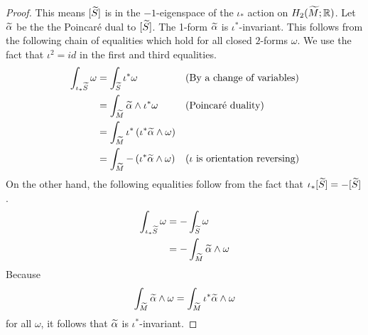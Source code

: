 \begin{proof}
  This means $[\widetilde{S}]$ is in the $-1$-eigenspace of the $\iota_{\ast}$ action on
  $H_2(\widetilde{M}; \mathbb{R})$. Let $\widetilde{\alpha}$ be the the Poincar\'e dual to $[\widetilde{S}]$. The 1-form $\widetilde{\alpha}$ is $\iota^{\ast}$-invariant. This follows from
  the following chain of equalities which hold for all closed $2$-forms $\omega$.  We use the fact that $\iota^2=id$ in the first and third equalities.
  \begin{align*}
    \int_{\iota_{\ast}\widetilde{S}} \omega &= \int_{\widetilde{S}} \iota^{\ast}\omega &&\text{(By a change of variables)} \\
                                     &= \int_{\widetilde{M}} \widetilde{\alpha} \wedge \iota^{\ast} \omega &&\text{(Poincar\'e duality)} \\
                                     &=\int_{\widetilde{M}} \iota^{\ast} \left( \iota^{\ast}\widetilde{\alpha} \wedge \omega \right) \\
    &= \int_{\widetilde{M}} - \left( \iota^{\ast} \widetilde{\alpha} \wedge \omega \right) &&\text{($\iota$ is orientation reversing)}
  \end{align*}
  On the other hand, the following equalities follow from the fact that
  $\iota_{\ast}[\widetilde{S}] = -[\widetilde{S}]$.
  \begin{align*}
    \int_{\iota_{\ast}\widetilde{S}} \omega &= - \int_{\widetilde{S}} \omega \\
                              &= - \int_{\widetilde{M}} \widetilde{\alpha} \wedge \omega
  \end{align*}
  Because $$\int_{\widetilde{M}}\widetilde{\alpha}\wedge\omega=\int_{\widetilde{M}}\iota^\ast\widetilde{\alpha}\wedge\omega$$ for all $\omega$, it follows that $\widetilde{\alpha}$ is
  $\iota^{\ast}$-invariant.
\end{proof}

